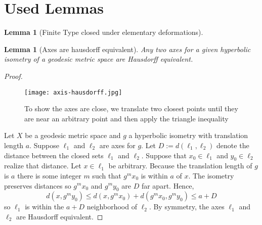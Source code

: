 \documentclass{article}
\theoremstyle{mystyle}
\newtheorem{lem}[thm]{Lemma}
\theoremstyle{remark}
\begin{document}
\section{Used Lemmas}

\begin{lem}
    [Finite Type closed under elementary deformations]
    \label{lem:ftdef}
\end{lem}

\begin{lem}
    [Axes are hausdorff equivalent]
    \label{lem:axeshausdorff}
    Any two axes for a given hyperbolic isometry of a geodesic metric space are Hausdorff equivalent.
\end{lem}
\begin{proof}

\begin{figure}[htp]
    \centering
    \texttt{[image: axis-hausdorff.jpg]}
    \caption{To show the axes are close, we translate two closest points until they are near an arbitrary point and then apply the triangle inequality}
    \label{fig:axis-hausdorff}
\end{figure}

    Let $X$ be a geodesic metric space and $g$ a hyperbolic isometry with translation length $a$. Suppose $\ell_1$ and $\ell_2$ are axes for $g$. Let $D:= d(\ell_1,\ell_2)$ denote the distance between the closed sets $\ell_1$ and $\ell_2$. Suppose that $x_0\in\ell_1$ and $y_0\in\ell_2$ realize that distance. Let $x\in\ell_1$ be arbitrary. Because the translation length of $g$ is $a$ there is some integer $m$ such that $g^mx_0$ is within $a$ of $x$. The isometry preserves distances so $g^mx_0$ and $g^my_0$ are $D$ far apart. Hence, $$d(x, g^my_0)\leq d(x, g^mx_0) + d(g^mx_0, g^my_0)\leq a+D$$ so $\ell_1$ is within the $a+D$ neighborhood of $\ell_2$. By symmetry, the axes $\ell_1$ and $\ell_2$ are Hausdorff equivalent.
\end{proof}
\end{document}
